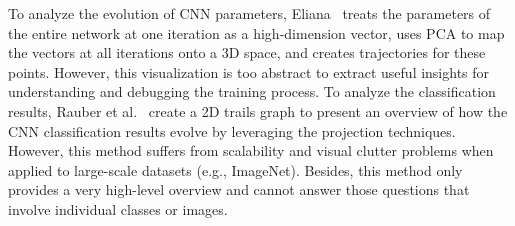 \documentclass[format=acmsmall, review=false, screen=true]{acmart}
\begin{document}
To analyze the evolution of CNN parameters, Eliana~\cite{eliana2016pca} treats the parameters of the entire network at one iteration as a high-dimension vector, uses PCA to map the vectors at all iterations onto a 3D space, and creates trajectories for these points. However, this visualization is too abstract to extract useful insights for understanding and debugging the training process.
To analyze the classification results, Rauber et al.~\cite{rauber2017visualizing} create a 2D trails graph to present an overview of how the CNN classification results evolve by leveraging the projection techniques.
However, this method suffers from scalability and visual clutter problems when applied to large-scale datasets (e.g., ImageNet). Besides, this method only provides a very high-level overview and cannot answer those questions that involve individual classes or images.
\end{document}
